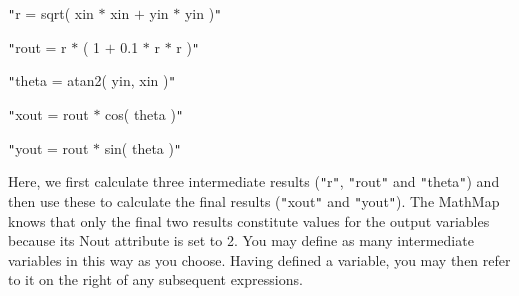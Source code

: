 \documentclass[twoside,11pt]{article}
\begin{document}
{{{         \sstitem
         {\tt{"}}r = sqrt( xin $*$ xin $+$ yin $*$ yin ){\tt{"}}

         \sstitem
         {\tt{"}}rout = r $*$ ( 1 $+$ 0.1 $*$ r $*$ r ){\tt{"}}

         \sstitem
         {\tt{"}}theta = atan2( yin, xin ){\tt{"}}

         \sstitem
         {\tt{"}}xout = rout $*$ cos( theta ){\tt{"}}

         \sstitem
         {\tt{"}}yout = rout $*$ sin( theta ){\tt{"}}

      }
      Here, we first calculate three intermediate results ({\tt{"}}r{\tt{"}}, {\tt{"}}rout{\tt{"}}
      and {\tt{"}}theta{\tt{"}}) and then use these to calculate the final results ({\tt{"}}xout{\tt{"}}
      and {\tt{"}}yout{\tt{"}}). The MathMap knows that only the final two results
      constitute values for the output variables because its Nout attribute
      is set to 2. You may define as many intermediate variables in this
      way as you choose. Having defined a variable, you may then refer to it
      on the right of any subsequent expressions.

}}
\end{document}
